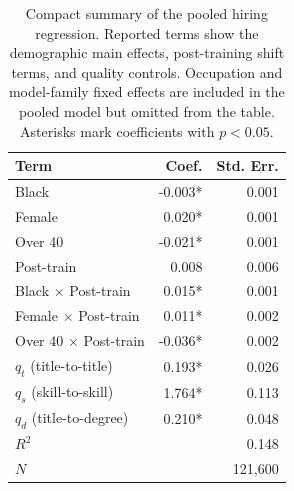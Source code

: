 \begin{table}[p]
\centering
\scriptsize
\setlength{\tabcolsep}{5pt}
\renewcommand{\arraystretch}{1.12}
\begin{tabular}{lrr}
\toprule
Term & Coef. & Std. Err. \\
\midrule
Black & -0.003* & 0.001 \\
Female & 0.020* & 0.001 \\
Over 40 & -0.021* & 0.001 \\
Post-train & 0.008 & 0.006 \\
Black $\times$ Post-train & 0.015* & 0.001 \\
Female $\times$ Post-train & 0.011* & 0.002 \\
Over 40 $\times$ Post-train & -0.036* & 0.002 \\
$q_t$ (title-to-title) & 0.193* & 0.026 \\
$q_s$ (skill-to-skill) & 1.764* & 0.113 \\
$q_d$ (title-to-degree) & 0.210* & 0.048 \\
\midrule
$R^2$ & \multicolumn{2}{r}{0.148} \\
$N$ & \multicolumn{2}{r}{121,600} \\
\hline
\end{tabular}
\caption{Compact summary of the pooled hiring regression. Reported terms show the demographic main effects, post-training shift terms, and quality controls. Occupation and model-family fixed effects are included in the pooled model but omitted from the table. Asterisks mark coefficients with $p < 0.05$.}
\label{tab:appendix-pooled-regression-summary}
\end{table}

